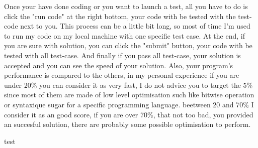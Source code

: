 \documentclass[12pt, letterpaper]{article}
\begin{document}
Once your have done coding or you want to launch a test, all you have to do is click the "run code" at the right bottom, your code with be tested with the test-code next to you.
This process can be a little bit long, so most of time I'm used to run my code on my local machine with one specific test case.
At the end, if you are sure with solution, you can click the "submit" button, your code with be tested with all test-case. And finally if you pass all test-case, your solution is accepted and you can see the speed of your solution. Also, your program's performance is compared to the others, in my personal experience if you are under 20\% you can consider it as very fast, I do not advice you to target the 5\% since most of them are made of low level optimisation such like bitwise operation or syntaxique sugar for a specific programming language.
beetween 20 and 70\% I consider it as an good score, if you are over 70\%, that not too bad, you provided an succesful solution, there are probably some possible optimisation to perform.






test
\end{document}

